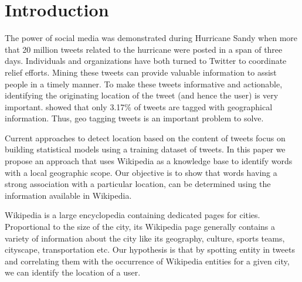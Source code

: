 \section{Introduction}
\label{sec:Introduction}

The power of social media was demonstrated during Hurricane Sandy when more that 20 million tweets related to the hurricane were posted in a span of three days. Individuals and organizations have both turned to Twitter to coordinate relief efforts. Mining these tweets can provide valuable information to assist people in a timely manner\cite{purohit2013emergency}. To make these tweets informative and actionable, identifying the originating location of the tweet (and hence the user) is very important. \cite{morstatter2013sample} showed that only 3.17\% of tweets are tagged with geographical information. Thus, geo tagging tweets is an important problem to solve.

Current approaches to detect location based on the content of tweets focus on building statistical models using a training dataset of tweets. In this paper we propose an approach that uses Wikipedia as a knowledge base to identify words with a local geographic scope. Our objective is to show that words having a strong association with a particular location, can be determined using the information available in Wikipedia.

Wikipedia is a large encyclopedia containing dedicated pages for cities. Proportional to the size of the city, its Wikipedia page generally contains a variety of information about the city like its geography, culture, sports teams, cityscape, transportation etc. Our hypothesis is that by spotting entity in tweets and correlating them with the occurrence of Wikipedia entities for a given city, we can identify the location of a user. 





